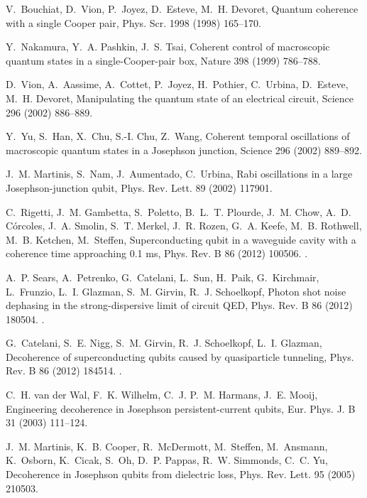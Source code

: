 \documentclass[3p,sort&compress,12pt]{elsarticle}
\begin{document}
\begin{thebibliography}{100}
V.~Bouchiat, D.~Vion, P.~Joyez, D.~Esteve, M.~H. Devoret, Quantum coherence
  with a single {C}ooper pair, Phys. Scr. 1998 (1998) 165--170.

Y.~Nakamura, Y.~A. Pashkin, J.~S. Tsai, Coherent control of macroscopic quantum
  states in a single-{C}ooper-pair box, Nature 398 (1999) 786--788.

D.~Vion, A.~Aassime, A.~Cottet, P.~Joyez, H.~Pothier, C.~Urbina, D.~Esteve,
  M.~H. Devoret, Manipulating the quantum state of an electrical circuit,
  Science 296 (2002) 886--889.

Y.~Yu, S.~Han, X.~Chu, S.-I. Chu, Z.~Wang, Coherent temporal oscillations of
  macroscopic quantum states in a {J}osephson junction, Science 296 (2002)
  889--892.

J.~M. Martinis, S.~Nam, J.~Aumentado, C.~Urbina, Rabi oscillations in a large
  {J}osephson-junction qubit, Phys. Rev. Lett. 89 (2002) 117901.

C.~Rigetti, J.~M. Gambetta, S.~Poletto, B.~L.~T. Plourde, J.~M. Chow, A.~D.
  C\'orcoles, J.~A. Smolin, S.~T. Merkel, J.~R. Rozen, G.~A. Keefe, M.~B.
  Rothwell, M.~B. Ketchen, M.~Steffen, Superconducting qubit in a waveguide
  cavity with a coherence time approaching 0.1 ms, Phys. Rev. B 86 (2012)
  100506.
\newblock \href {http://dx.doi.org/10.1103/PhysRevB.86.100506}
  {}.

A.~P. Sears, A.~Petrenko, G.~Catelani, L.~Sun, H.~Paik, G.~Kirchmair,
  L.~Frunzio, L.~I. Glazman, S.~M. Girvin, R.~J. Schoelkopf, Photon shot noise
  dephasing in the strong-dispersive limit of circuit {QED}, Phys. Rev. B 86
  (2012) 180504.
\newblock \href {http://dx.doi.org/10.1103/PhysRevB.86.180504}
  {}.

G.~Catelani, S.~E. Nigg, S.~M. Girvin, R.~J. Schoelkopf, L.~I. Glazman,
  Decoherence of superconducting qubits caused by quasiparticle tunneling,
  Phys. Rev. B 86 (2012) 184514.
\newblock \href {http://dx.doi.org/10.1103/PhysRevB.86.184514}
  {}.

C.~H. {van der Wal}, F.~K. Wilhelm, C.~J. P.~M. Harmans, J.~E. Mooij,
  Engineering decoherence in {J}osephson persistent-current qubits, Eur. Phys.
  J. B 31 (2003) 111--124.

J.~M. Martinis, K.~B. Cooper, R.~McDermott, M.~Steffen, M.~Ansmann, K.~Osborn,
  K.~Cicak, S.~Oh, D.~P. Pappas, R.~W. Simmonds, C.~C. Yu, Decoherence in
  {J}osephson qubits from dielectric loss, Phys. Rev. Lett. 95 (2005) 210503.


\end{thebibliography}
\end{document}
